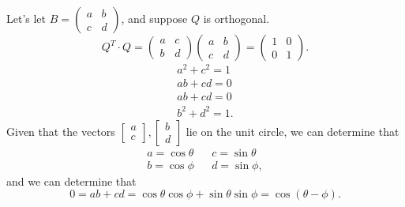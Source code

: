         Let's let $B=\begin{pmatrix} a&b\\c&d \end{pmatrix} $, and suppose $Q$ is orthogonal.
        \[
          Q^{T}\cdot Q=\begin{pmatrix} a&c\\b&d \end{pmatrix} \begin{pmatrix} a&b\\c&d \end{pmatrix} =\begin{pmatrix} 1&0\\0&1 \end{pmatrix} 
        .\] 
        \begin{align*}
          a^2+c^2=1\\
          ab+cd=0\\
          ab+cd=0\\
          b^2+d^2=1
        .\end{align*}
        Given that the vectors $\begin{bmatrix} a\\c \end{bmatrix} ,\begin{bmatrix} b\\d \end{bmatrix} $ lie on the unit circle, we can determine that
        \begin{align*}
          a=\cos\theta&&c=\sin \theta\\
          b=\cos\phi&&d=\sin\phi
        ,\end{align*}
        and we can determine that 
        \[
          0=ab+cd=\cos\theta\cos\phi + \sin \theta\sin\phi=\cos(\theta-\phi)
        .\] 
